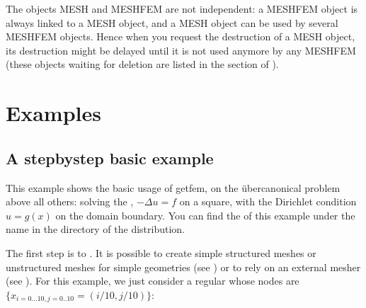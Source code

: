\documentclass[a4paper,11pt,english]{sphinxmanual}
\begin{document}
The objects MESH and MESHFEM are not independent: a MESHFEM object is always
linked to a MESH object, and a MESH object can be used by several MESHFEM
objects. Hence when you request the destruction of a MESH object, its destruction
might be delayed until it is not used anymore by any MESHFEM (these objects
waiting for deletion are listed in the  section of
).


\chapter{Examples}
\label{\detokenize{matlab_octave/examples:examples}}\label{\detokenize{matlab_octave/examples:mlab-examples}}\label{\detokenize{matlab_octave/examples::doc}}

\section{A step\sphinxhyphen{}by\sphinxhyphen{}step basic example}
\label{\detokenize{matlab_octave/examples:a-step-by-step-basic-example}}\label{\detokenize{matlab_octave/examples:mlab-laplacianexample}}
This example shows the basic usage of getfem, on the über\sphinxhyphen{}canonical problem above
all others: solving the , \(-\Delta u = f\) on a square,
with the Dirichlet condition \(u = g(x)\) on the domain boundary. You can find
the  of this example under the name  in the
directory  of the  distribution.

The first step is to . It is possible to create simple structured meshes or unstructured meshes for simple geometries (see ) or to rely on an external mesher (see ).  For this example, we
just consider a regular  whose nodes are
\(\{x_{i=0\ldots10,j=0..10}=(i/10,j/10)\}\):

\begin{sphinxVerbatim}[commandchars=\\\{\}]
 
   \PYG{p}{[}\PYG{p}{]}\PYG{p}{[}\PYG{p}{]}
 
      
     
\end{sphinxVerbatim}
\end{document}
